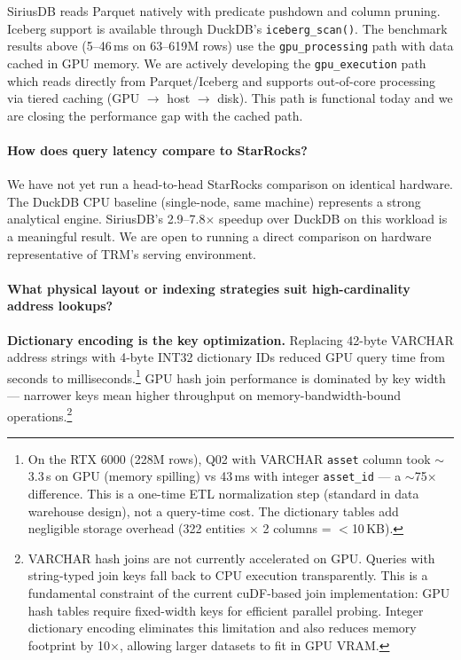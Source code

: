 \documentclass[11pt,a4paper]{article}
\begin{document}
SiriusDB reads Parquet natively with predicate pushdown and column pruning.
Iceberg support is available through DuckDB's \texttt{iceberg\_scan()}. The
benchmark results above (5--46\,ms on 63--619M rows) use the
\texttt{gpu\_processing} path with data cached in GPU memory. We are actively
developing the \texttt{gpu\_execution} path which reads directly from
Parquet/Iceberg and supports out-of-core processing via tiered caching
(GPU $\to$ host $\to$ disk). This path is functional today and we are closing
the performance gap with the cached path.

\paragraph{How does query latency compare to StarRocks?}

We have not yet run a head-to-head StarRocks comparison on identical hardware.
The DuckDB CPU baseline (single-node, same machine) represents a strong
analytical engine. SiriusDB's 2.9--7.8$\times$ speedup over DuckDB on this
workload is a meaningful result. We are open to running a direct comparison on
hardware representative of TRM's serving environment.

\paragraph{What physical layout or indexing strategies suit high-cardinality address lookups?}

\textbf{Dictionary encoding is the key optimization.} Replacing 42-byte VARCHAR
address strings with 4-byte INT32 dictionary IDs reduced GPU query time from
seconds to milliseconds.\footnote{On the RTX 6000 (228M rows), Q02 with
VARCHAR \texttt{asset} column took $\sim$3.3\,s on GPU (memory spilling) vs
43\,ms with integer \texttt{asset\_id} --- a $\sim$75$\times$ difference. This
is a one-time ETL normalization step (standard in data warehouse design), not a
query-time cost. The dictionary tables add negligible storage overhead (322
entities $\times$ 2 columns = $<$10\,KB).} GPU hash join performance is
dominated by key width --- narrower keys mean higher throughput on
memory-bandwidth-bound operations.\footnote{VARCHAR hash joins are not
currently accelerated on GPU. Queries with string-typed join keys fall back to
CPU execution transparently. This is a fundamental constraint of the current
cuDF-based join implementation: GPU hash tables require fixed-width keys for
efficient parallel probing. Integer dictionary encoding eliminates this
limitation and also reduces memory footprint by 10$\times$, allowing larger
datasets to fit in GPU VRAM.}
\end{document}
